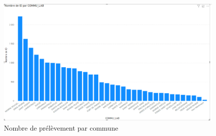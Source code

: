 \documentclass{report}
\begin{document}
\begin{figure}[!h]
\centering
\includegraphics[width = 1
\linewidth]{nombre_prel_par_commune.png}
\caption{Nombre de prélèvement par commune}
\end{figure}
\end{document}

